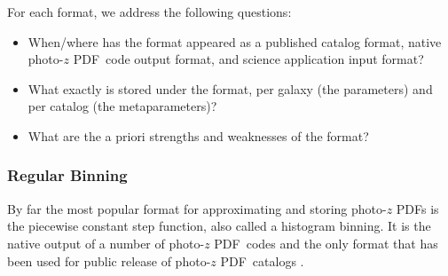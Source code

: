 \documentclass[\docopts]{\docclass}
\newcommand{\pz}{photo-$z$ PDF}
\begin{document}
For each format, we address the following questions:
\begin{itemize}[noitemsep, topsep=5pt, partopsep=0pt, parsep=0pt, itemsep=5pt]
  \item When/where has the format appeared as a published catalog format, 
native \pz\ code output format, and science application input format?
  \item What exactly is stored under the format, per galaxy (the parameters) 
and per catalog (the metaparameters)?
  \item What are the a priori strengths and weaknesses of the format?
\end{itemize}

\subsubsection{Regular Binning}
\label{sec:bins}

By far the most popular format for approximating and storing \pz s is the 
piecewise constant step function, also called a histogram binning.
It is the native output of a number of \pz\ codes 
\citep{carrasco_kind_somz:_2014, sadeh_annz2:_2016, cavuoti_metaphor:_2017} and 
the only format that has been used for public release of \pz\ catalogs 
\citep{sheldon_photometric_2012, tanaka_photometric_2017, jong_third_2017}.
\end{document}
